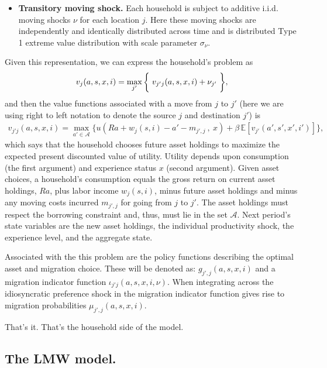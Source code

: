 \documentclass[12pt,pdftex]{article}
\begin{document}
\begin{onehalfspacing}
\begin{itemize}
\item \textbf{Transitory moving shock.} Each household is subject to additive i.i.d. moving shocks $\nu$ for each location $j$. Here these moving shocks are independently and identically distributed across time and is distributed Type 1 extreme value distribution with scale parameter $\sigma_{\nu}$.
\end{itemize}
Given this representation, we can express the household's problem as
\begin{align}
\small
v_j(a, s, x, i) = \max_{j'} \bigg\{ \ v_{j'j}(a, s, x, i) + \nu_{j'} \ \bigg \},
\label{eq:value_fun}
\end{align}
and then the value functions associated with a move from $j$ to $j'$ (here we are using right to left notation to denote the source $j$ and destination $j'$) is
\begin{align}
v_{j'j}(a, s, x, i) = \max_{a'\in \mathcal{A}}\bigg  \{ u(Ra + w_{j}(s, i) - a' - m_{j',j} \ , \  x)  + \beta \, \mathbb{E} [v_{j'}(a', s', x', i')]  \bigg\},
\label{eq:value_fun_locaiton}
\end{align}
which says that the household chooses future asset holdings to maximize the expected present discounted value of utility.  Utility depends upon consumption (the first argument) and experience status $x$ (second argument).  Given asset choices, a household's consumption equals the gross return on current asset holdings, $Ra$, plus labor income $w_{j}(s, i)$, minus future asset holdings and minus any moving costs incurred $m_{j',j}$ for going from $j$ to $j'$. The asset holdings must respect the borrowing constraint and, thus, must lie in the set $\mathcal{A}$. Next period's state variables are the new asset holdings, the individual productivity shock, the experience level, and the aggregate state.

Associated with the this problem are the policy functions describing the optimal asset and migration choice. These will be denoted as: $g_{j',j}(a, s, x, i)$ and a migration indicator function $\iota_{j'j}(a, s, x, i, \nu)$. When integrating across the idiosyncratic preference shock in the migration indicator function gives rise to migration probabilities $\mu_{j',j}(a, s, x, i)$.

That's it. That's the household side of the model.

\subsection{The LMW model.}


\end{onehalfspacing}
\end{document}
